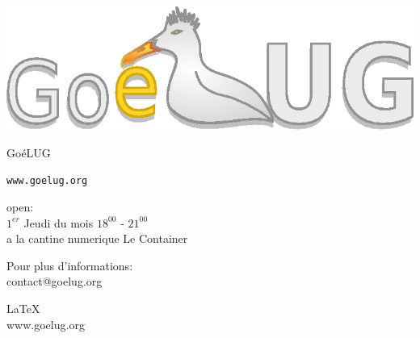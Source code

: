 \documentclass[a4paper]{scrartcl}
\begin{document}
\sffamily


	\begin{center}
	

		\includegraphics[scale=0.35]{goelug}

		\vspace{10pt}
	
		\huge
	
		Go\'{e}LUG
	
	
		\normalsize
	
		{\tt www.goelug.org}

		\vspace{42pt}
	
		\textsf{open:} \\[18pt]
		$ 1^{er} $ Jeudi du mois $ 18^{00} $ - $ 21^{00} $ \\

		a la cantine numerique
		Le Container	
 	
 		\vspace{10pt}
		
	\end{center}






\begin{center}
\textsf{
	Pour plus d'informations: \\
	contact@goelug.org
}

\small{\LaTeX{} \\
\textsf{www.goelug.org}}
	
\end{center}
\end{document}
